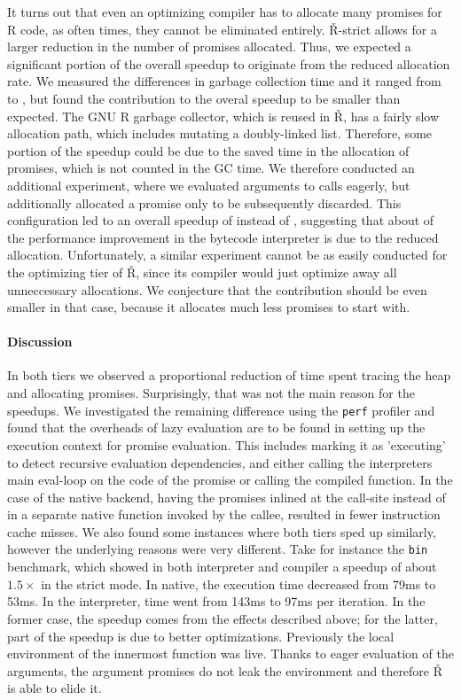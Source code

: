 \documentclass[review,nonacm,screen,acmsmall,anonymous=true]{acmart}
\renewcommand{\Rsh}{{\sf\v R}\xspace}
\newcommand{\Rshstrict}{{\sf\v R-strict}\xspace}
\begin{document}
It turns out that even an optimizing compiler has to allocate many promises for R
code, as often times, they cannot be eliminated entirely. \Rshstrict allows for
a larger reduction in the number of promises allocated.
Thus, we expected a significant portion of the overall speedup to originate from
the reduced allocation rate. We measured the differences in garbage collection
time and it ranged from \speedupGCRshStrictMin to \speedupGCRshStrictMax, but
found the contribution to the overal speedup to be smaller than expected.
The GNU R garbage collector, which is reused in \Rsh, has a fairly slow allocation path, which
includes mutating a doubly-linked list. Therefore, some portion of the speedup
could be due to the saved time in the allocation of promises, which is not counted in the GC time.
We therefore conducted an additional experiment, where we evaluated arguments to
calls eagerly, but additionally allocated a promise only to be subsequently discarded.
This configuration led to an overall speedup of
\speedupBCRshStrictAlloc instead of \speedupBCRshStrict, suggesting that
about \speedupDueToReducedGC of the performance improvement in the bytecode interpreter is due to the
reduced allocation. Unfortunately, a similar experiment cannot be as easily conducted
for the optimizing tier of \Rsh, since its compiler would just optimize away all
unneccessary allocations. We conjecture that the contribution should be even
smaller in that case, because it allocates much less promises to start with.

\paragraph{Discussion}

In both tiers we observed a proportional reduction of time spent tracing the
heap and allocating promises. Surprisingly, that was not the main reason
for the speedups. We investigated the remaining difference using the
\lstinline{perf} profiler and found that the overheads of lazy evaluation are to
be found in setting up the execution context for promise evaluation. This
includes marking it as 'executing' to detect recursive evaluation dependencies,
and either calling the interpreters main eval-loop on the code of the promise or
calling the compiled function. In the case of the native backend, having the
promises inlined at the call-site instead of in a separate native function
invoked by the callee, resulted in fewer instruction cache misses. We also found
some instances where both tiers sped up similarly, however the underlying
reasons were very different. Take for instance the \lstinline{bin} benchmark,
which showed in both interpreter and compiler a speedup of about $1.5\times$ in
the strict mode. In native, the execution time decreased from 79ms to 53ms. In
the interpreter, time went from 143ms to 97ms per iteration. In the former case,
the speedup comes from the effects described above; for the latter, part of the
speedup is due to better optimizations. Previously the local environment of
the innermost function was live. Thanks to eager evaluation of the arguments,
the argument promises do not leak the environment and therefore \Rsh is able to
elide it.
\end{document}
